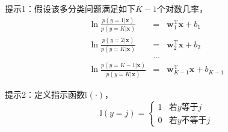 \documentclass[a4paper,UTF8]{article}
\numberwithin{equation}{section}
\theoremstyle{definition}
\begin{document}
提示1：假设该多分类问题满足如下$K-1$个对数几率，
\begin{eqnarray*}
\ln\frac{p(y=1|\mathbf{x})}{p(y=K|\mathbf{x})}&=&\mathbf{w}_1^\mathrm{T}\mathbf{x}+b_1\\
\ln\frac{p(y=2|\mathbf{x})}{p(y=K|\mathbf{x})}&=&\mathbf{w}_2^\mathrm{T}\mathbf{x}+b_2\\
&\dots&\\
\ln\frac{p(y={K-1}|\mathbf{x})}{p(y=K|\mathbf{x})}&=&\mathbf{w}_{K-1}^\mathrm{T}\mathbf{x}+b_{K-1}
\end{eqnarray*}

提示2：定义指示函数$\mathbb{I}(\cdot)$，
$$\mathbb{I}(y=j)=
\begin{cases}
1& \text{若$y$等于$j$}\\
0& \text{若$y$不等于$j$}
\end{cases}$$
\end{document}
